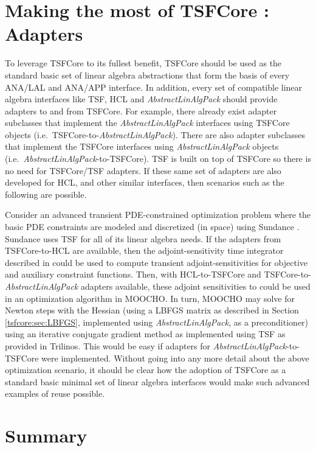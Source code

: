 %
\section{Making the most of TSFCore : Adapters}
\label{tsfcore:sec:adapters}
%

To leverage TSFCore to its fullest benefit, TSFCore should be used as
the standard basic set of linear algebra abstractions that form the
basis of every ANA/LAL and ANA/APP interface.  In addition, every set
of compatible linear algebra interfaces like TSF, HCL and
{}\textit{AbstractLinAlgPack} should provide adapters to and from
TSFCore.  For example, there already exist adapter subclasses that
implement the {}\textit{AbstractLinAlgPack} interfaces using TSFCore
objects (i.e.~TSFCore-to-\textit{AbstractLinAlgPack}).  There are also
adapter subclasses that implement the TSFCore interfaces using
{}\textit{AbstractLinAlgPack} objects
(i.e.~\textit{AbstractLinAlgPack}-to-TSFCore).  TSF is built on top of
TSFCore so there is no need for TSFCore/TSF adapters.  If these same
set of adapters are also developed for HCL, and other similar
interfaces, then scenarios such as the following are possible.

Consider an advanced transient PDE-constrained optimization problem
where the basic PDE constraints are modeled and discretized (in space)
using Sundance {}\cite{krlong:Sundance}.  Sundance uses TSF for all of
its linear algebra needs.  If the adapters from TSFCore-to-HCL are
available, then the adjoint-sensitivity time integrator described in
{}\cite{Gockenbach:2002:EAI} could be used to compute transient
adjoint-sensitivities for objective and auxiliary constraint
functions.  Then, with HCL-to-TSFCore and
TSFCore-to-\textit{AbstractLinAlgPack} adapters available, these
adjoint sensitivities to could be used in an optimization algorithm in
MOOCHO.  In turn, MOOCHO may solve for Newton steps with the Hessian
(using a LBFGS matrix as described in Section
{}\ref{tsfcore:sec:LBFGS}, implemented using
{}\textit{AbstractLinAlgPack}, as a preconditioner) using an iterative
conjugate gradient method as implemented using TSF as provided in
Trilinos.  This would be easy if adapters for
{}\textit{AbstractLinAlgPack}-to-TSFCore were implemented.  Without
going into any more detail about the above optimization scenario, it
should be clear how the adoption of TSFCore as a standard basic
minimal set of linear algebra interfaces would make such advanced
examples of reuse possible.

%
\section{Summary}
%

